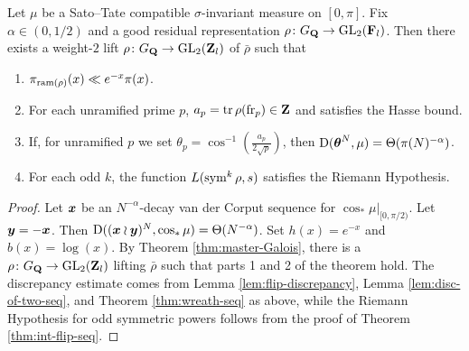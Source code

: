 \begin{theorem}\label{thm:bad-Galois}
Let $\mu$ be a Sato--Tate compatible $\sigma$-invariant measure on $[0,\pi]$. 
Fix $\alpha\in (0,1/2)$ and a good residual representation 
$\rho\colon G_{\mathbf{Q}} \to \operatorname{GL}_2(\mathbf{F}_l)$. Then there exists a weight-$2$ lift 
$\rho\colon G_{\mathbf{Q}} \to \operatorname{GL}_2(\mathbf{Z}_l)$ of $\bar\rho$ such that 
\begin{enumerate}
\item
$\pi_{\mathrm{ram}(\rho)}(x) \ll e^{-x}\pi(x)$. 

\item
For each unramified prime $p$, $a_p = \operatorname{tr}\rho(\mathrm{fr}_p)\in \mathbf{Z}$ and satisfies 
the Hasse bound. 

\item
If, for unramified $p$ we set 
$\theta_p = \cos^{-1}\left(\frac{a_p}{2\sqrt p}\right)$, then 
$\operatorname{D}({\boldsymbol\theta}^N,\mu) = \Theta(\pi(N)^{-\alpha})$. 

\item
For each odd $k$, the function $L(\operatorname{sym}^k \rho,s)$ satisfies the Riemann 
Hypothesis. 
\end{enumerate}
\end{theorem}
\begin{proof}
Let ${\boldsymbol x}$ be an $N^{-\alpha}$-decay van der Corput sequence for 
$\cos_\ast \left.\mu\right|_{[0,\pi/2)}$. Let ${\boldsymbol y} = -{\boldsymbol x}$. Then 
$\operatorname{D}(({\boldsymbol x}\wr{\boldsymbol y})^N,\cos_\ast\mu) = \Theta(N^{-\alpha})$. Set $h(x) = e^{-x}$ 
and $b(x) = \log(x)$. By Theorem \ref{thm:master-Galois}, there is a 
$\rho\colon G_{\mathbf{Q}} \to \operatorname{GL}_2(\mathbf{Z}_l)$ lifting $\bar\rho$ such that parts 
1 and 2 of the theorem hold. The discrepancy estimate comes from Lemma 
\ref{lem:flip-discrepancy}, Lemma \ref{lem:disc-of-two-seq}, and Theorem 
\ref{thm:wreath-seq} as above, while the Riemann Hypothesis for odd symmetric 
powers follows from the proof of Theorem \ref{thm:int-flip-seq}. 
\end{proof}
